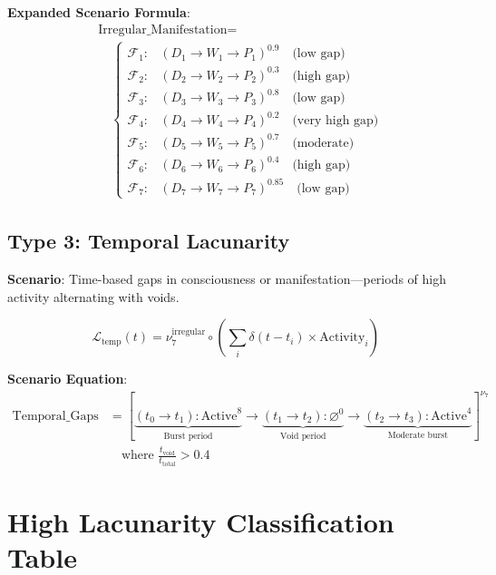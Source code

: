 \documentclass[11pt,twoside]{book}
\newcommand{\noe}[1]{\nu_{#1}}
\newcommand{\Foundations}{\mathcal{F}}
\begin{document}
\textbf{Expanded Scenario Formula}:
\begin{align}
    &\text{Irregular\_Manifestation} = \nonumber \\
    &\quad \left\{
    \begin{array}{ll}
        \Foundations_1: & (D_1 \to W_1 \to P_1)^{0.9} \quad \text{(low gap)} \\
        \Foundations_2: & (D_2 \to W_2 \to P_2)^{0.3} \quad \text{(high gap)} \\
        \Foundations_3: & (D_3 \to W_3 \to P_3)^{0.8} \quad \text{(low gap)} \\
        \Foundations_4: & (D_4 \to W_4 \to P_4)^{0.2} \quad \text{(very high gap)} \\
        \Foundations_5: & (D_5 \to W_5 \to P_5)^{0.7} \quad \text{(moderate)} \\
        \Foundations_6: & (D_6 \to W_6 \to P_6)^{0.4} \quad \text{(high gap)} \\
        \Foundations_7: & (D_7 \to W_7 \to P_7)^{0.85} \quad \text{(low gap)}
    \end{array}
    \right.
\end{align}

\subsection{Type 3: Temporal Lacunarity}

\textbf{Scenario}: Time-based gaps in consciousness or manifestation---periods of
high activity alternating with voids.

\begin{equation}
\boxed{
    \mathcal{L}_{\mathrm{temp}}(t) = \noe{7}^{\mathrm{irregular}} \circ
    \left( \sum_{i} \delta(t - t_i) \times \mathrm{Activity}_i \right)
}
\end{equation}

\textbf{Scenario Equation}:
\begin{align}
    \text{Temporal\_Gaps} &= \left[
    \underbrace{(t_0 \to t_1): \mathrm{Active}^{8}}_{\text{Burst period}}
    \to \underbrace{(t_1 \to t_2): \varnothing^{0}}_{\text{Void period}}
    \to \underbrace{(t_2 \to t_3): \mathrm{Active}^{4}}_{\text{Moderate burst}}
    \right]^{\noe{7}} \nonumber \\
    &\quad \text{where } \frac{t_{\mathrm{void}}}{t_{\mathrm{total}}} > 0.4
\end{align}

\section{High Lacunarity Classification Table}
\end{document}
